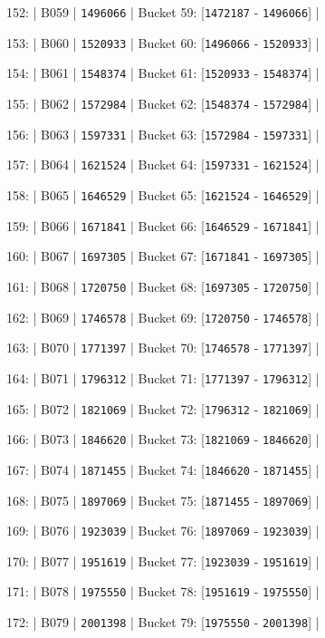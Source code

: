 \documentclass[11pt,a4paper]{article}
\begin{document}
{152: | B059 | \texttt{1496066} | Bucket 59: [\texttt{1472187} - \texttt{1496066}] |

153: | B060 | \texttt{1520933} | Bucket 60: [\texttt{1496066} - \texttt{1520933}] |

154: | B061 | \texttt{1548374} | Bucket 61: [\texttt{1520933} - \texttt{1548374}] |

155: | B062 | \texttt{1572984} | Bucket 62: [\texttt{1548374} - \texttt{1572984}] |

156: | B063 | \texttt{1597331} | Bucket 63: [\texttt{1572984} - \texttt{1597331}] |

157: | B064 | \texttt{1621524} | Bucket 64: [\texttt{1597331} - \texttt{1621524}] |

158: | B065 | \texttt{1646529} | Bucket 65: [\texttt{1621524} - \texttt{1646529}] |

159: | B066 | \texttt{1671841} | Bucket 66: [\texttt{1646529} - \texttt{1671841}] |

160: | B067 | \texttt{1697305} | Bucket 67: [\texttt{1671841} - \texttt{1697305}] |

161: | B068 | \texttt{1720750} | Bucket 68: [\texttt{1697305} - \texttt{1720750}] |

162: | B069 | \texttt{1746578} | Bucket 69: [\texttt{1720750} - \texttt{1746578}] |

163: | B070 | \texttt{1771397} | Bucket 70: [\texttt{1746578} - \texttt{1771397}] |

164: | B071 | \texttt{1796312} | Bucket 71: [\texttt{1771397} - \texttt{1796312}] |

165: | B072 | \texttt{1821069} | Bucket 72: [\texttt{1796312} - \texttt{1821069}] |

166: | B073 | \texttt{1846620} | Bucket 73: [\texttt{1821069} - \texttt{1846620}] |

167: | B074 | \texttt{1871455} | Bucket 74: [\texttt{1846620} - \texttt{1871455}] |

168: | B075 | \texttt{1897069} | Bucket 75: [\texttt{1871455} - \texttt{1897069}] |

169: | B076 | \texttt{1923039} | Bucket 76: [\texttt{1897069} - \texttt{1923039}] |

170: | B077 | \texttt{1951619} | Bucket 77: [\texttt{1923039} - \texttt{1951619}] |

171: | B078 | \texttt{1975550} | Bucket 78: [\texttt{1951619} - \texttt{1975550}] |

172: | B079 | \texttt{2001398} | Bucket 79: [\texttt{1975550} - \texttt{2001398}] |

}
\end{document}
